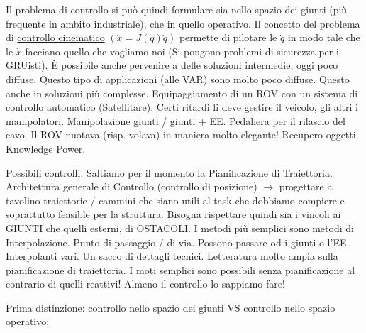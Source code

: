 Il problema di controllo si può quindi formulare sia nello spazio dei giunti (più frequente in ambito industriale), che in quello operativo. Il concetto del problema di \underline{controllo cinematico} $(\dot{x}=J(q)\dot{q})$ permette di pilotare le $\dot{q}$ in modo tale che le $\dot{x}$ facciano quello che vogliamo noi (Si pongono problemi di sicurezza per i GRUisti). \`E possibile anche pervenire a delle soluzioni intermedie, oggi poco diffuse. Questo tipo di applicazioni (alle VAR) sono molto poco diffuse. Questo anche in soluzioni più complesse. Equipaggiamento di un ROV con un sistema di controllo automatico (Satellitare). Certi ritardi li deve gestire il veicolo, gli altri i manipolatori. Manipolazione giunti / giunti + EE. Pedaliera per il rilascio del cavo. Il ROV nuotava (risp. volava) in maniera molto elegante! Recupero oggetti. Knowledge Power.

Possibili controlli. Saltiamo per il momento la Pianificazione di Traiettoria. Architettura generale di Controllo (controllo di posizione) $\rightarrow$ progettare a tavolino traiettorie / cammini che siano utili al task che dobbiamo compiere e soprattutto \underline{feasible} per la struttura. Bisogna rispettare quindi sia i vincoli ai GIUNTI che quelli esterni, di OSTACOLI. I metodi più semplici sono metodi di Interpolazione. Punto di passaggio / di via. Possono passare od i giunti o l'EE. Interpolanti vari. Un sacco di dettagli tecnici. Letteratura molto ampia sulla \underline{pianificazione di traiettoria}. I moti semplici sono possibili senza pianificazione al contrario di quelli reattivi! Almeno il controllo lo sappiamo fare!

Prima distinzione: controllo nello spazio dei giunti VS controllo nello spazio operativo:

